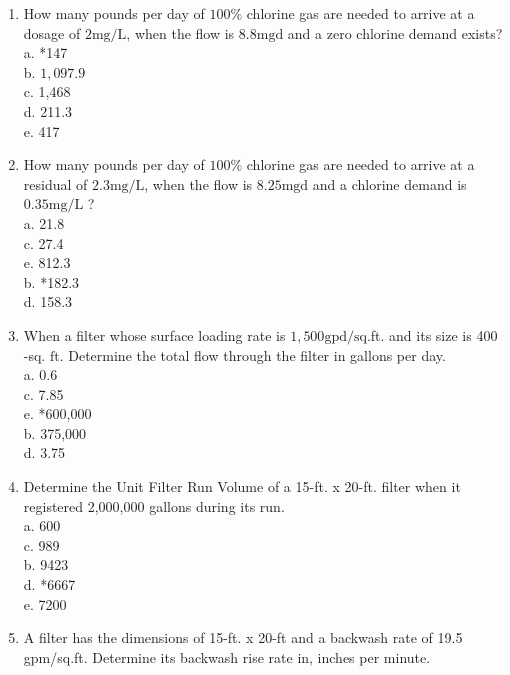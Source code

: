 \begin{enumerate}










\item How many pounds per day of $100 \%$ chlorine gas are needed to arrive at a dosage of $2 \mathrm{mg} / \mathrm{L}$, when the flow is $8.8 \mathrm{mgd}$ and a zero chlorine demand exists?\\
a. *147\\
b. $1,097.9$\\
c. 1,468\\
d. 211.3\\
e. 417\\
  \item How many pounds per day of $100 \%$ chlorine gas are needed to arrive at a residual of $2.3 \mathrm{mg} / \mathrm{L}$, when the flow is $8.25 \mathrm{mgd}$ and a chlorine demand is $0.35 \mathrm{mg} / \mathrm{L}$ ?\\
a. 21.8\\
c. 27.4\\
e. 812.3\\
b. *182.3\\
d. 158.3\\
  \item When a filter whose surface loading rate is $1,500 \mathrm{gpd} / \mathrm{sq}$.ft. and its size is 400 -sq. $\mathrm{ft}$. Determine the total flow through the filter in gallons per day.\\
a. 0.6\\
c. 7.85\\
e. *600,000\\
b. 375,000\\
d. 3.75\\
  \item Determine the Unit Filter Run Volume of a 15-ft. x 20-ft. filter when it registered 2,000,000 gallons during its run.\\
a. 600\\
c. 989\\
b. 9423\\
d. *6667\\
e. 7200\\
  \item A filter has the dimensions of 15-ft. x 20-ft and a backwash rate of 19.5 gpm/sq.ft. Determine its backwash rise rate in, inches per minute.\\

\end{enumerate}
